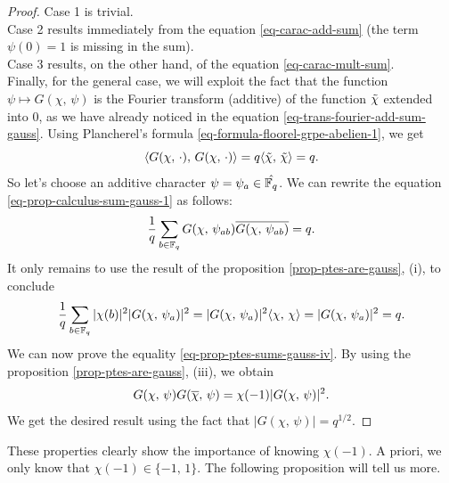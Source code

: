\begin{proof}
Case 1 is trivial. \\Case 2 results immediately from the equation \eqref{eq-carac-add-sum} (the term $ \psi (0) = 1 $ is missing in the sum). \\Case 3 results, on the other hand, of the equation \eqref{eq-carac-mult-sum}. \\Finally, for the general case, we will exploit the fact that the function $ \psi \mapsto G (\chi, \, \psi) $ is the Fourier transform (additive) of the function $ \tilde{\chi} $ extended into $ 0 $, as we have already noticed in the equation \eqref{eq-trans-fourier-add-sum-gauss}. Using Plancherel's formula \eqref{eq-formula-floorel-grpe-abelien-1}, we get
\begin{equation}
\label{eq-prop-calculus-sum-gauss-1}
\langle G (\chi, \, \cdot),\,G (\chi, \, \cdot)\rangle = q \langle \tilde{\chi},\,\tilde{\chi}\rangle = q.
\end{equation}
So let's choose an additive character $ \psi = \psi_a \in \hat{\mathbb{F}_q} $. We can rewrite the equation \eqref{eq-prop-calculus-sum-gauss-1} as follows:
\begin{equation*}
\frac{1}{q} \sum_{b \in \mathbb{F}_q}{G (\chi, \, \psi_{ab}) \overline{G (\chi, \, \psi_{ab})}} = q.
\end{equation*}
It only remains to use the result of the proposition \ref{prop-ptes-are-gauss}, (i), to conclude
\begin{equation*}
\frac{1}{q} \sum_{b \in \mathbb{F}_q}{| \chi (b) |^2 | G (\chi, \, \psi_{a}) |^2} = | G (\chi, \, \psi_{a}) |^2 \langle \chi,\,\chi\rangle = | G (\chi, \, \psi_{a}) |^2 = q.
\end{equation*}
We can now prove the equality \eqref{eq-prop-ptes-sums-gauss-iv}. By using the proposition \ref{prop-ptes-are-gauss}, (iii), we obtain
\begin{equation*}
G (\chi, \, \psi) G (\overline{\chi}, \, \psi) = \chi (-1) | G (\chi, \, \psi) |^2.
\end{equation*}
We get the desired result using the fact that $ | G (\chi, \, \psi) | = q^{1/2} $.
\end{proof}
 
 
 
These properties clearly show the importance of knowing $ \chi (-1) $. A priori, we only know that $ \chi (-1) \in \{- 1, \, 1\} $. The following proposition will tell us more.
 
